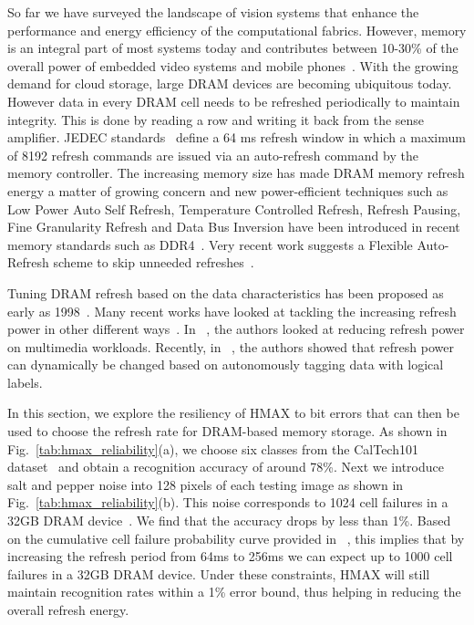 So far we have surveyed the landscape of vision systems that enhance the 
performance and energy efficiency of the computational fabrics. 
However, memory is an integral part of most systems today and contributes 
between 10-30\% of the overall power of embedded video systems and 
mobile phones~\cite{CarrollAaronHeiser2010}. With the growing demand for cloud storage, large DRAM devices are becoming ubiquitous today. 
However data in every DRAM cell needs to be refreshed periodically to maintain integrity. This is done by reading a row and writing it back 
from the sense amplifier. JEDEC standards~\cite{jedec-sdram-standards}  define a 64 ms refresh window in which a maximum of 8192 refresh commands are issued via an auto-refresh command by the memory controller. 
The increasing memory size has made DRAM memory refresh energy a matter of growing concern and new 
power-efficient techniques such as Low Power Auto Self Refresh, Temperature Controlled Refresh, Refresh Pausing, Fine Granularity Refresh and Data Bus 
Inversion have been introduced in recent memory standards such as DDR4~\cite{jedec-sdram-standards}. Very recent work suggests a Flexible Auto-Refresh scheme to 
skip unneeded refreshes~\cite{isca2015}.

Tuning DRAM refresh based on the data characteristics has been proposed as early as 1998~\cite{islped98}.  
Many recent works have looked at tackling the increasing refresh power in other 
different ways~\cite{Liu2012, Stuecheli2010}. In ~\cite{Liu2011}, the 
authors looked at reducing refresh power on multimedia workloads. Recently, in ~\cite{iccd2014}, the authors showed that 
refresh power can dynamically be changed based on autonomously tagging data with logical labels.

In this section, we explore the resiliency of HMAX to bit errors that can then be used to choose the refresh rate for DRAM-based memory storage.  
As shown in Fig.~\ref{tab:hmax_reliability}(a), we choose six classes from the CalTech101 dataset~\cite{Fergus2004} 
and obtain a recognition accuracy of around 78\%. Next we introduce salt and pepper noise into 128 pixels of each testing image 
as shown in Fig.~\ref{tab:hmax_reliability}(b). This noise corresponds to 1024 cell failures in a 32GB DRAM device~\cite{Liu2012}. 
We find that the accuracy drops by less than 1\%. 
Based on the cumulative cell failure probability curve provided in ~\cite{Liu2012}, this implies 
that by increasing the refresh period from 64ms to 256ms we can expect up to 1000 cell failures in a 32GB DRAM device. Under these constraints, HMAX will 
still maintain recognition rates within a 1\% error bound, thus helping in reducing the overall refresh energy.

